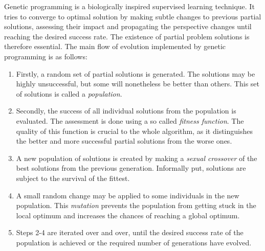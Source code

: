 \documentclass[12pt,oneside]{fithesis2}		%
\renewcommand{\_}{\leavevmode \kern0.0em\vbox{\hrule width0.4em}}
\begin{document}
Genetic programming \parencite{genetic-programming} is a biologically inspired supervised learning technique. 
It tries to converge to optimal 
solution by making subtle changes to previous partial solutions, assessing their impact and propagating the perspective changes
until reaching the desired success rate. The existence of partial problem solutions is therefore essential.
The main flow of evolution implemented by genetic programming is as follows:
\begin{enumerate} \rightskip=2em
\item Firstly, a random set of partial solutions is generated. The solutions may be highly unsuccessful,
but some will nonetheless be better than others. This set of solutions is called a \textit{population}.
\item Secondly, the success of all individual solutions from the population is evaluated. The assessment is done using
a so called \textit{fitness function}. The quality of this function is crucial to the whole algorithm, as it
distinguishes the better and more successful partial solutions from the worse ones.
\item A new population of solutions is created by making a \textit{sexual crossover} of the best solutions from the 
previous generation. Informally put, solutions are subject to the survival of the fittest.
\item A small random change may be applied to some individuals in the new population. This \textit{mutation} prevents
the population from getting stuck in the local optimum and increases the chances of reaching a global optimum.
\item Steps 2-4 are iterated over and over, until the desired success rate of the population is achieved or the
required number of generations have evolved.
\end{enumerate}
\end{document}

